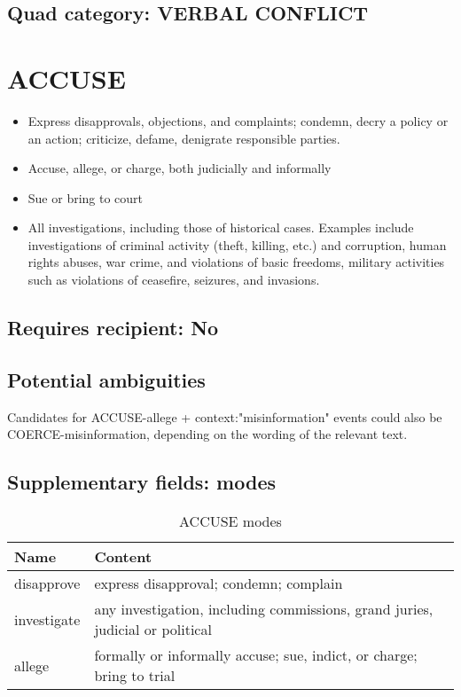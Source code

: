 \documentclass[11pt]{report}
\newcommand{\plcat}[1]{\textsf{#1}}
\begin{document}
\subsection{Quad category: VERBAL CONFLICT}

\newpage


\section{ACCUSE}

\begin{itemize}
	\item Express disapprovals, objections, and complaints; condemn, decry a policy or an action; criticize, defame, denigrate responsible parties.
	\item Accuse, allege, or charge, both judicially and informally
	\item Sue or bring to court
	\item All investigations, including those of historical cases. Examples include investigations of  criminal activity (theft, killing, etc.) and corruption, human rights abuses, war crime, and violations of basic freedoms, military activities such as violations of ceasefire, seizures, and invasions.
\end{itemize}


\subsection{Requires recipient: No}

\subsection{Potential ambiguities}

Candidates for \plcat{ACCUSE}-allege + context:"misinformation" events could also be \plcat{COERCE}-misinformation, depending on the wording of the relevant text.

\subsection{Supplementary fields: modes}

\begin{table}[htp]
\caption{\plcat{ACCUSE} modes}
\begin{center}
\begin{tabular}{|l|p{13cm}|}
\hline
Name & Content \\
\hline
disapprove & express disapproval; condemn; complain\\
investigate & any investigation, including commissions, grand juries, judicial or political\\
allege & formally or informally accuse; sue, indict, or charge; bring to trial\\
\hline
\end{tabular}
\end{center}
\label{tab:accusemode}
\end{table}%
\end{document}
